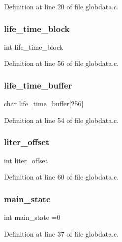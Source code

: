 Definition at line 20 of file globdata.\+c.

\mbox{\label{globdata_8c_aa301d715ce1013286a2d0bf7adb6b8af}} 
\subsubsection{life\+\_\+time\+\_\+block}
{\footnotesize\ttfamily int life\+\_\+time\+\_\+block}



Definition at line 56 of file globdata.\+c.

\mbox{\label{globdata_8c_a88d2d73bff40e3b4a4853e2f4a420098}} 
\subsubsection{life\+\_\+time\+\_\+buffer}
{\footnotesize\ttfamily char life\+\_\+time\+\_\+buffer[256]}



Definition at line 54 of file globdata.\+c.

\mbox{\label{globdata_8c_a2d0b3bc49a15d13c30284763b458dd55}} 
\subsubsection{liter\+\_\+offset}
{\footnotesize\ttfamily int liter\+\_\+offset}



Definition at line 60 of file globdata.\+c.

\mbox{\label{globdata_8c_af4056f02cdd1c220c82e2ff7d5b35caf}} 
\subsubsection{main\+\_\+state}
{\footnotesize\ttfamily int main\+\_\+state =0}



Definition at line 37 of file globdata.\+c.

